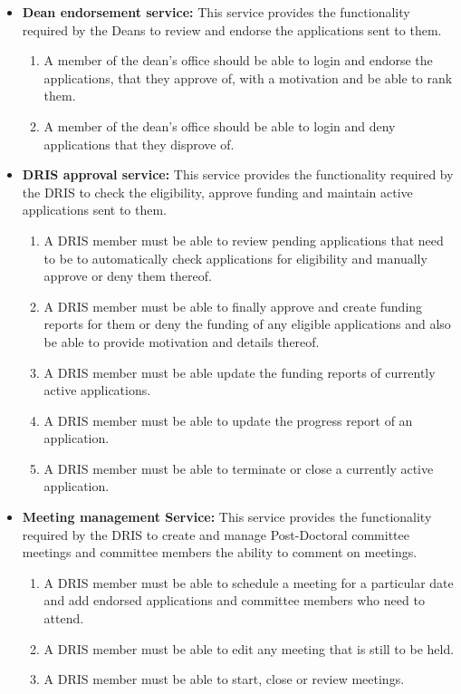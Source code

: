 \documentclass[12pt]{article}
\begin{document}
\begin{itemize}
		\item \textbf{Dean endorsement service:}
		This service provides the functionality required by the Deans to review and endorse the applications sent to them.
		\begin{enumerate}		
			\item A member of the dean's office should be able to login and endorse the applications, that they approve of, with a motivation and be able to rank them.
			\item A member of the dean's office should be able to login and deny applications that they disprove of.				 					
		\end{enumerate}
		\item \textbf{DRIS approval service:}
		This service provides the functionality required by the DRIS to check the eligibility, approve funding and maintain active applications sent to them.
		\begin{enumerate}		
			\item A DRIS member must be able to review pending applications that need to be to automatically check applications for eligibility and manually approve or deny them thereof.
			\item A DRIS member must be able to finally approve and create funding reports for them or deny the funding of any eligible applications and also be able to provide motivation and details thereof.
			\item A DRIS member must be able update the funding reports of currently active applications.
			\item A DRIS member must be able to update the progress report of an application.
			\item A DRIS member must be able to terminate or close a currently active application.				 					
		\end{enumerate}
		\item\textbf{Meeting management Service:}
		This service provides the functionality required by the DRIS to create and manage Post-Doctoral committee meetings and committee members the ability to comment on meetings.
		\begin{enumerate}
			\item A DRIS member must be able to schedule a meeting for a particular date and add endorsed applications and committee members who need to attend. 
			\item A DRIS member must be able to edit any meeting that is still to be held.
			\item A DRIS member must be able to start, close or review meetings.

\end{enumerate}
\end{itemize}
\end{document}
